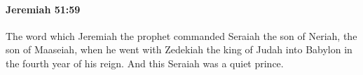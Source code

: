 
		\paragraph{Jeremiah 51:59} %
			\label{JEREMIAH-51-59}

			The word which Jeremiah the prophet commanded Seraiah the son of Neriah, the son of Maaseiah, when he went with Zedekiah the king of Judah into Babylon in the fourth year of his reign. And this Seraiah was a quiet prince.


